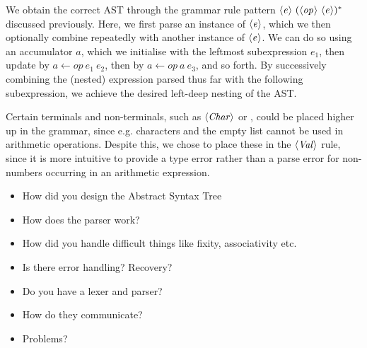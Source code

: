 We obtain the correct AST through the grammar rule pattern
$\langle \textit{e}\kern.7pt \rangle\ (\langle \textit{op}\kern.7pt \rangle\ \langle \textit{e}\kern.7pt \rangle)^*$ discussed previously.
Here, we first parse an instance of $\langle \textit{e}\kern.7pt \rangle$, which we then optionally combine
repeatedly with another instance of $\langle \textit{e}\kern.7pt \rangle$. We can do so using an
accumulator $a$, which we initialise with the leftmost subexpression
$e_1$, then update by $a \leftarrow op\ e_1\ e_2$, then by
$a \leftarrow op\ a\ e_3$, and so forth. By successively combining the (nested)
expression parsed thus far with the following subexpression, we achieve the
desired left-deep nesting of the AST.

Certain terminals and non-terminals, such as $\langle \textit{Char}\kern.7pt \rangle$ or \code{[]}, could be
placed higher up in the grammar, since e.g. characters and the empty list cannot
be used in arithmetic operations. Despite this, we chose to place these in the
$\langle \textit{Val}\kern.7pt \rangle$ rule, since it is more intuitive to provide a type error rather than
a parse error for non-numbers occurring in an arithmetic expression.




\begin{todoenv}
  \begin{itemize}
    \item How did you design the Abstract Syntax Tree
    \item How does the parser work?
    \item How did you handle difficult things like fixity, associativity etc.
    \item Is there error handling? Recovery?
    \item Do you have a lexer and parser?
    \item How do they communicate?
    \item Problems?
  \end{itemize}
\end{todoenv}

